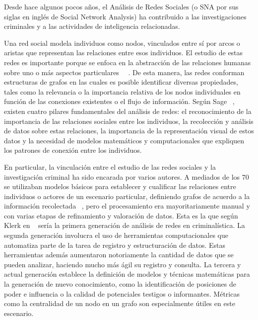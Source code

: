 
Desde hace algunos pocos años, el Análisis de Redes Sociales (o SNA por sus siglas en inglés de Social Network Analysis) ha contribuido a las investigaciones criminales y a las actividades de inteligencia relacionadas.

Una red social modela individuos como nodos, vinculados entre sí por arcos o aristas que representan las relaciones entre esos individuos. El estudio de estas redes es importante porque se enfoca en la abstracción de las relaciones humanas sobre uno o más aspectos particulares ~\cite{ref_article2}~\cite{ref_article3}. De esta manera, las redes conforman estructuras de grafos en las cuales es posible identificar diversas propiedades, tales como la relevancia o la importancia relativa de los nodos individuales en función de las conexiones existentes o el flujo de información. Según Sage~\cite{ref_article4} , existen cuatro pilares fundamentales del análisis de redes: el reconocimiento de la importancia de las relaciones sociales entre los individuos, la recolección y análisis de datos sobre estas relaciones, la importancia de la representación visual de estos datos y la necesidad de modelos matemáticos y computacionales que expliquen los patrones de conexión entre los individuos.

En particular, la vinculación entre el estudio de las redes sociales y la investigación criminal ha sido encarada por varios autores. A mediados de los 70 se utilizaban modelos básicos para establecer y cualificar las relaciones entre individuos o actores de un escenario particular, definiendo grafos de acuerdo a la información recolectada ~\cite{ref_article5}, pero el procesamiento era mayoritariamente manual y con varias etapas de refinamiento y valoración de datos. Esta es la que según Klerk en ~\cite{ref_article6} sería la primera generación de análisis de redes en criminalística. La segunda generación involucra el uso de herramientas computacionales que automatiza parte de la tarea de registro y estructuración de datos. Estas herramientas además aumentaron notoriamente la cantidad de datos que se pueden analizar, haciendo mucho más ágil su registro y consulta. La tercera y actual generación establece la definición de modelos y técnicas matemáticas para la generación de nuevo conocimiento, como la identificación de posiciones de poder e influencia o la calidad de potenciales testigos o informantes. Métricas como la centralidad de un nodo en un grafo son especialmente útiles en este escenario.

